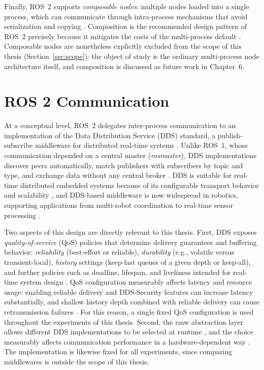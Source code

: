 Finally, ROS~2 supports \emph{composable nodes}: multiple nodes loaded
into a single process, which can communicate through intra-process
mechanisms that avoid serialization and copying \cite{macenski2023}.
Composition is the recommended design pattern of ROS~2 precisely because
it mitigates the costs of the multi-process default \cite{macenski2022,macenski2023}. Composable nodes are nonetheless explicitly excluded from
the scope of this thesis (Section~\ref{sec:scope}): the object of study is
the ordinary multi-process node architecture itself, and composition is
discussed as future work in Chapter~6.

\section{ROS 2 Communication}
\label{sec:ros2-communication}

At a conceptual level, ROS~2 delegates inter-process communication to an
implementation of the Data Distribution Service (DDS) standard, a
publish-subscribe middleware for distributed real-time systems
\cite{gambo2025, macenski2022}. Unlike ROS~1, whose communication depended
on a central master (\emph{rosmaster}), DDS implementations discover peers
automatically, match publishers with subscribers by topic and type, and
exchange data without any central broker \cite{macenski2022, gambo2025}.
DDS is suitable for real-time distributed embedded systems because of its
configurable transport behavior and scalability \cite{maruyama2016}, and
DDS-based middleware is now widespread in robotics, supporting applications
from multi-robot coordination to real-time sensor processing
\cite{gambo2025}.

Two aspects of this design are directly relevant to this thesis. First,
DDS exposes \emph{quality-of-service} (QoS) policies that determine
delivery guarantees and buffering behavior: \emph{reliability}
(best-effort or reliable), \emph{durability} (e.g., volatile versus
transient-local), \emph{history} settings (keep-last queues of a given
depth or keep-all), and further policies such as deadline, lifespan, and
liveliness intended for real-time system design \cite{macenski2022,zotero-item-9}. QoS configuration measurably affects latency and resource
usage: enabling reliable delivery and DDS-Security features can increase
latency substantially, and shallow history depth combined with reliable
delivery can cause retransmission failures \cite{fernandez2020,kronauer2021}. For this reason, a single fixed QoS configuration is used
throughout the experiments of this thesis. Second, the rmw abstraction
layer allows different DDS implementations to be selected at runtime
\cite{maruyama2016, macenski2022}, and the choice measurably affects
communication performance in a hardware-dependent way
\cite{maruyama2016, kronauer2021, zhang2024}. The implementation is
likewise fixed for all experiments, since comparing middlewares is outside
the scope of this thesis.

